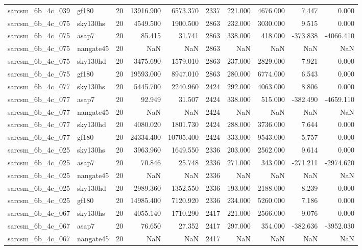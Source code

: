 \documentclass{article}
\begin{document}
\begin{longtable}{llrrrrrrrr}
sarcsm\_6b\_4c\_039 & gf180 & 20 & 13916.900 & 6573.370 & 2337 & 221.000 & 4676.000 & 7.447 & 0.000 \\
sarcsm\_6b\_4c\_075 & sky130hs & 20 & 4549.500 & 1900.500 & 2863 & 232.000 & 3030.000 & 9.515 & 0.000 \\
sarcsm\_6b\_4c\_075 & asap7 & 20 & 85.415 & 31.741 & 2863 & 338.000 & 418.000 & -373.838 & -4066.410 \\
sarcsm\_6b\_4c\_075 & nangate45 & 20 & NaN & NaN & 2863 & NaN & NaN & NaN & NaN \\
sarcsm\_6b\_4c\_075 & sky130hd & 20 & 3475.690 & 1579.010 & 2863 & 237.000 & 2829.000 & 7.921 & 0.000 \\
sarcsm\_6b\_4c\_075 & gf180 & 20 & 19593.000 & 8947.010 & 2863 & 280.000 & 6774.000 & 6.543 & 0.000 \\
sarcsm\_6b\_4c\_077 & sky130hs & 20 & 5445.700 & 2240.960 & 2424 & 292.000 & 4063.000 & 8.806 & 0.000 \\
sarcsm\_6b\_4c\_077 & asap7 & 20 & 92.949 & 31.507 & 2424 & 338.000 & 515.000 & -382.490 & -4659.110 \\
sarcsm\_6b\_4c\_077 & nangate45 & 20 & NaN & NaN & 2424 & NaN & NaN & NaN & NaN \\
sarcsm\_6b\_4c\_077 & sky130hd & 20 & 4080.020 & 1801.730 & 2424 & 288.000 & 3736.000 & 7.644 & 0.000 \\
sarcsm\_6b\_4c\_077 & gf180 & 20 & 24334.400 & 10705.400 & 2424 & 333.000 & 9543.000 & 5.757 & 0.000 \\
sarcsm\_6b\_4c\_025 & sky130hs & 20 & 3963.960 & 1649.550 & 2336 & 203.000 & 2562.000 & 9.614 & 0.000 \\
sarcsm\_6b\_4c\_025 & asap7 & 20 & 70.846 & 25.748 & 2336 & 271.000 & 343.000 & -271.211 & -2974.620 \\
sarcsm\_6b\_4c\_025 & nangate45 & 20 & NaN & NaN & 2336 & NaN & NaN & NaN & NaN \\
sarcsm\_6b\_4c\_025 & sky130hd & 20 & 2989.360 & 1352.550 & 2336 & 193.000 & 2188.000 & 8.239 & 0.000 \\
sarcsm\_6b\_4c\_025 & gf180 & 20 & 14985.400 & 7120.920 & 2336 & 234.000 & 5260.000 & 7.186 & 0.000 \\
sarcsm\_6b\_4c\_067 & sky130hs & 20 & 4055.140 & 1710.290 & 2417 & 221.000 & 2566.000 & 9.076 & 0.000 \\
sarcsm\_6b\_4c\_067 & asap7 & 20 & 76.650 & 27.352 & 2417 & 297.000 & 354.000 & -382.636 & -3952.030 \\
sarcsm\_6b\_4c\_067 & nangate45 & 20 & NaN & NaN & 2417 & NaN & NaN & NaN & NaN \\

\end{longtable}
\end{document}
